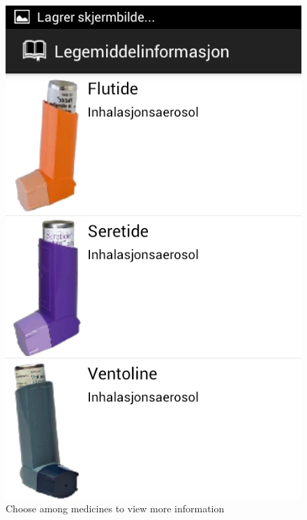 \begin{figure}
	\begin{minipage}[b]{0.4\linewidth}
		\centering
		\includegraphics[width=0.20\paperwidth]{Pictures/Screenshots/information.png}
	\caption{Choose among medicines to view more information}
	\label{fig:gapp-infomration}
	\end{minipage}
	\hspace{3cm}
	\begin{minipage}[b]{0.4\linewidth}
		\centering

\end{minipage}
\end{figure}
